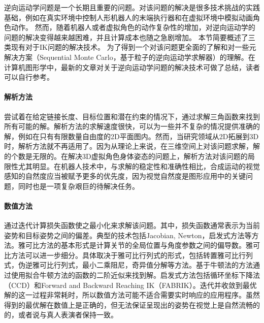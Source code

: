 逆向运动学问题是一个长期且重要的问题。对该问题的解决是很多技术挑战的实践基础，例如在真实环境中控制人形机器人的末端执行器\cite{Robot2005Motion}和在虚拟环境中模拟动画角色动作\cite{brogan1998dynamic}。 然而，随着机器人或者虚拟角色的动作复杂性的增加，对逆向运动学的问题的解决变得越来越困难，并且计算成本也随之急剧增加。 本节简要概述了三类现有对于IK问题的解决技术。 为了得到一个对该问题更全面的了解和对一些元解决方案（Sequential Monte Carlo\cite{courty2008inverse}，基于粒子的逆向运动学求解器\cite{hecker2008real}）的理解。在计算机图形学中，最新的文章\cite{aristidou2018inverse}对关于逆向运动学问题的解决技术可做了总结，读者可以自行参考。

\paragraph{解析方法}尝试着在给定链接长度、目标位置和潜在约束的情况下，通过求解三角函数来找到所有可能的解\cite{LEE1984Geomatric,deepak}。解析方法的求解速度很快，可以为一些并不复杂的情况提供准确的解，例如在只有有限数量自由度的2D平面图内。然而，当研究领域从2D拓展到3D时，解析方法就不再适用了。因为从理论上来说，在三维空间上对该问题求解，解的个数是无限的。在解决3D虚拟角色身体姿态的问题上，解析方法对该问题的局限性尤其明显。在机器人技术中，与求解的稳定性和准确性相比，合成运动的视觉感知的自然度应当被赋予更多的优先度，因为视觉自然度是图形应用中的关键问题，同时也是一项复杂艰巨的待解决任务。

\paragraph{数值方法}通过迭代计算损失函数使之最小化来求解该问题。其中，损失函数通常表示为当前姿势和目标姿势之间的偏差。典型的技术包括Jacobian, Newton，启发式方法等方法。雅可比方法的基本形式是计算关节的全局位置与角度参数之间的偏导数\cite{buss2004introduction}。雅可比方法可以进一步细分。具体取决于雅可比行列式的形式，包括转置雅可比行列式\cite{unzueta2008full}，伪逆雅可比行列式\cite{mukherjee2015inverse}，最小二乘阻尼\cite{harish2016parallel}，奇异值分解\cite{colome2012redundant}等方法。基于牛顿法的方法通过使用拟合牛顿方法\cite{zhao1994inverse,rose1996efficient}的函数的二阶近似来找到解。启发式方法包括循环坐标下降法（CCD）\cite{kenwright2012inverse}和Forward and Backward Reaching IK（FABRIK）\cite{aristidou2011fabrik}。迭代并收敛到最优解的这一过程非常耗时，所以数值方法可能不适合需要实时响应的应用程序。虽然得到的最优解在数值上是正确的，但无法保证呈现出的姿势在视觉上是自然流畅的的，或者说与真人表演者保持一致。


